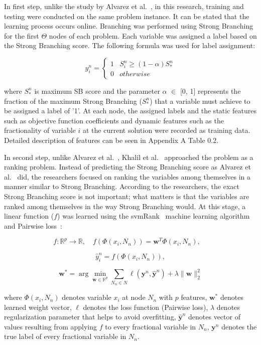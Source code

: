 In first step, unlike the study by Alvarez et al.~\cite{alvarezMachineLearningBasedApproximation2017}, in this research, training and testing were conducted on the same problem instance.
It can be stated that the learning process occurs online.
Branching was performed using Strong Branching for the first $\Theta$ nodes of each problem.
Each variable was assigned a label based on the Strong Branching score.
The following formula was used for label assignment:

\[ y_i^n = \begin{cases}
      1 & S_i^n\geq (1-\alpha)S_*^n \\
      0 & otherwise
   \end{cases}
\]

where $S_*^n$ is maximum SB score and the parameter $\alpha$ $\in$ [0, 1] represents the fraction of the maximum Strong Branching ($S_*^n$) that a variable must achieve to be assigned a label of '1'.
At each node, the assigned labels and the static features such as objective function coefficients and dynamic features such as the fractionality of variable $i$ at the current solution were recorded as training data.
Detailed description of features can be seen in Appendix A Table 0.2. %


In second step, unlike Alvarez et al.~\cite{alvarezMachineLearningBasedApproximation2017}, Khalil et al.~\cite{khalilLearningBranchMixed2016} approached the problem as a ranking problem.
Instead of predicting the Strong Branching score as Alvarez et al.~\cite{alvarezMachineLearningBasedApproximation2017} did, the researchers focused on ranking the variables among themselves in a manner similar to Strong Branching.
According to the researchers, the exact Strong Branching score is not important; what matters is that the variables are ranked among themselves in the way Strong Branching would.
At this stage, a linear function ($f$) was learned using the svmRank~\cite{joachimsTrainingLinearSVMs2006} machine learning algorithm and Pairwise loss~\cite{joachimsOptimizingSearchEngines}:

\[
f: \mathbb{R}^p \rightarrow \mathbb{R}, \quad
f\left(\Phi(x_i, N_n)\right) = \mathbf{w}^T \Phi(x_i, N_n), \quad
\]

\[
\hat{y}_i^n = f\left(\Phi(x_i, N_n)\right),
\]

\[
\mathbf{w}^* = \arg\min_{\mathbf{w} \in \mathbb{R}^p}
\sum_{N_n \in N} \ell(\mathbf{y}^n, \hat{\mathbf{y}}^n)
+ \lambda \| \mathbf{w} \|_2^2
\]

where $\Phi(x_i, N_n)$ denotes variable $x_i$ at node $N_n$ with $p$ features, $\mathbf{w}^*$ denotes learned weight vector, $\ell$ denotes the loss function (Pairwise loss), $\lambda$ denotes regularization parameter that helps to avoid overfitting, $\hat{\mathbf{y}}^n$ denotes vector of values resulting from applying $f$ to every fractional variable in $N_n$, $\mathbf{y}^n$ denotes the true label of every fractional variable in $N_n$.


